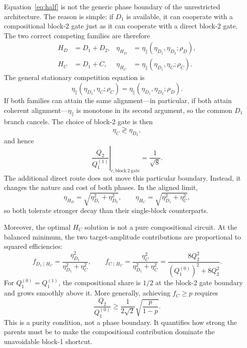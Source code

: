 \documentclass[11pt]{article}
\newcommand{\eone}{\eta_{D_1}}
\newcommand{\etwo}{\eta_{D_2}}
\newcommand{\ecomp}{\eta_C}
\begin{document}
Equation~\eqref{eq:half} is not the generic phase boundary of the unrestricted architecture.
The reason is simple: if \(D_1\) is available, it can cooperate with a compositional block-2
gate just as it can cooperate with a direct block-2 gate.  The two correct competing families
are therefore
\begin{align}
H_D&=D_1+D_2, &
\eta_{H_D}&=\eta_{\parallel}(\eone,\etwo;\rho_D),\\
H_C&=D_1+C, &
\eta_{H_C}&=\eta_{\parallel}(\eone,\ecomp;\rho_C).
\end{align}
The general stationary competition equation is
\begin{equation}
\boxed{
\eta_{\parallel}(\eone,\ecomp;\rho_C)
=
\eta_{\parallel}(\eone,\etwo;\rho_D).}
\label{eq:full-boundary}
\end{equation}
If both families can attain the same alignment---in particular, if both attain coherent
alignment---\(\eta_{\parallel}\) is monotone in its second argument, so the common \(D_1\)
branch cancels.  The choice of block-2 gate is then
\begin{equation}
\ecomp\gtrless\etwo,
\end{equation}
and hence
\begin{equation}
\boxed{
\left.\frac{Q_2}{Q_1^{(1)}}\right|_{c,\mathrm{block\ 2\ gate}}
=\frac1{\sqrt8}.}
\label{eq:old-boundary}
\end{equation}
The additional direct route does not move this particular boundary.  Instead, it changes the
nature and cost of both phases.  In the aligned limit,
\begin{equation}
\eta_{H_D}=\sqrt{\eone^2+\etwo^2},
\qquad
\eta_{H_C}=\sqrt{\eone^2+\ecomp^2},
\end{equation}
so both tolerate stronger decay than their single-block counterparts.

Moreover, the optimal \(H_C\) solution is not a pure compositional circuit.  At the balanced
minimum, the two target-amplitude contributions are proportional to squared efficiencies:
\begin{equation}
f_{D_1\mid H_C}=\frac{\eone^2}{\eone^2+\ecomp^2},
\qquad
f_{C\mid H_C}=\frac{\ecomp^2}{\eone^2+\ecomp^2}
=\frac{8Q_2^2}{(Q_1^{(0)})^2+8Q_2^2}.
\label{eq:hybrid-fraction}
\end{equation}
For \(Q_1^{(0)}=Q_1^{(1)}\), the compositional share is \(1/2\) at the block-2 gate boundary
and grows smoothly above it.  More generally, achieving \(f_C\geq p\) requires
\begin{equation}
\frac{Q_2}{Q_1^{(0)}}\geq
\frac1{2\sqrt2}\sqrt{\frac{p}{1-p}}.
\label{eq:purity}
\end{equation}
This is a purity condition, not a phase boundary.  It quantifies how strong the parents must be
to make the compositional contribution dominate the unavoidable block-1 shortcut.
\end{document}
